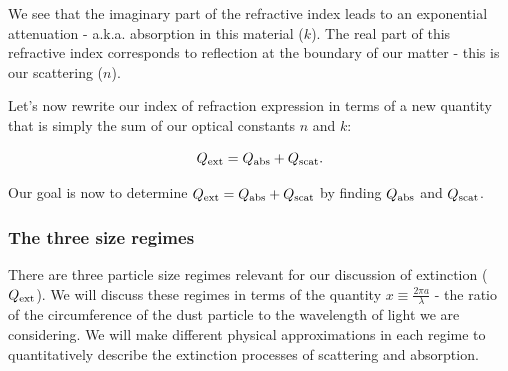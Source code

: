 \documentclass{article}
\begin{document}
We see that the imaginary part of the refractive index leads to an exponential attenuation - a.k.a. absorption in this material ($k$). The real part of this refractive index corresponds to reflection at the boundary of our matter - this is our scattering ($n$). 

Let's now rewrite our index of refraction expression in terms of a new quantity that is simply the sum of our optical constants $n$ and $k$:

\begin{equation}
Q_{\rm{ext}} = Q_{\rm{abs}} + Q_{\rm{scat}}.
\end{equation}

Our goal is now to determine $Q_{\rm{ext}} = Q_{\rm{abs}} + Q_{\rm{scat}}$ by finding $Q_{\rm{abs}}$ and $Q_{\rm{scat}}$.

\subsubsection*{The three size regimes}

There are three particle size regimes relevant for our discussion of extinction ($Q_{{\rm{ext}}}$). We will discuss these regimes in terms of the quantity $x \equiv \frac{2 \pi a}{\lambda}$ - the ratio of the circumference of the dust particle to the wavelength of light we are considering. We will make different physical approximations in each regime to quantitatively describe the extinction processes of scattering and absorption.
\end{document}
